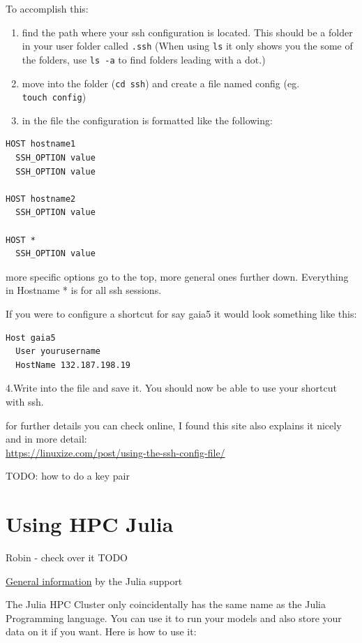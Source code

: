 \documentclass[
]{book}
\begin{document}
To accomplish this:

\begin{enumerate}
\def\labelenumi{\arabic{enumi}.}
\item
  find the path where your ssh configuration is located. This should
  be a folder in your user folder called \texttt{.ssh} (When using \texttt{ls} it
  only shows you the some of the folders, use \texttt{ls\ -a} to find folders
  leading with a dot.)
\item
  move into the folder (\texttt{cd\ ssh}) and create a file named config (eg.
  \texttt{touch\ config})
\item
  in the file the configuration is formatted like the following:
\end{enumerate}

\begin{verbatim}
HOST hostname1
  SSH_OPTION value
  SSH_OPTION value
  
HOST hostname2
  SSH_OPTION value

HOST *
  SSH_OPTION value
\end{verbatim}

more specific options go to the top, more general ones further down.
Everything in Hostname * is for all ssh sessions.

If you were to configure a shortcut for say gaia5 it would look
something like this:

\begin{verbatim}
Host gaia5
  User yourusername
  HostName 132.187.198.19
\end{verbatim}

4.Write into the file and save it. You should now be able to use your
shortcut with ssh.

for further details you can check online, I found this site also
explains it nicely and in more detail:\\
\url{https://linuxize.com/post/using-the-ssh-config-file/}

TODO: how to do a key pair

\section{Using HPC Julia}\label{using-hpc-julia}

Robin - check over it TODO

\href{https://doku.hpc.uni-wuerzburg.de/}{General information} by the Julia support

The Julia HPC Cluster only coincidentally has the same name as the Julia
Programming language. You can use it to run your models and also store
your data on it if you want. Here is how to use it:
\end{document}
